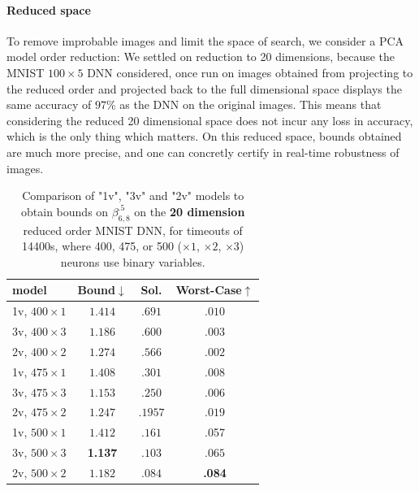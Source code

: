 \paragraph{Reduced space}

To remove improbable images and limit the space of search, 
we consider a PCA model order reduction: We settled on reduction to 20 dimensions, because the MNIST $100 \times 5$ DNN considered, once run on images obtained from projecting to the reduced order and projected back to the full dimensional space displays the same accuracy of $97$\% as the DNN on the original images. This means that considering the reduced 20 dimensional space
does not incur any loss in accuracy, which is the only thing which matters. On this reduced space, bounds obtained are much more precise, and one can concretly certify in real-time robustness of images.

	\begin{table}[h!]
	\begin{tabular}{||l||c|c|c||}\hline\hline
		model &        Bound$\downarrow$ &  Sol. &      Worst-Case$\uparrow$ \\\hline \hline
1v, $400 \times 1$ & $1.414$ &  $.691$ & $.010$ \\\hline 
3v, $400 \times 3$ & $1.186$ & $.600$ & $.003$ \\\hline 
2v, $400 \times 2$ & $1.274$ & $.566$ & $.002$ \\\hline\hline
	 
1v, $475 \times 1$ &  $1.408$ & $.301$ & $.008$  \\\hline 
3v, $475 \times 3$ &  $1.153$ & $.250$ & $.006$ \\ \hline 
2v, $475 \times 2$ &  $1.247$ & $.1957$ & $.019$ \\\hline\hline


1v, $500 \times 1$ & $1.412$ & $.161$ & .057 \\\hline 
3v, $500 \times 3$ & {\bf 1.137} & $.103$ & $.065$\\\hline 
2v, $500 \times 2$ &  $1.182$ & $.084$& {\bf .084}  \\\hline\hline
	 
	\end{tabular}
	\caption{Comparison of "1v", "3v" and "2v" models 
	to obtain bounds on $\beta^{.5}_{6,8}$ on the {\bf 20 dimension}  reduced order MNIST DNN, for timeouts of 14400s, where 400, 475,  or 500 ($\times 1$, $\times 2$, $\times 3$) neurons use binary variables.}
	\label{table.reduced}
\end{table}


